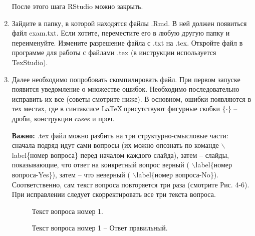 \documentclass[11pt, a4paper]{extarticle}
\newcommand{\code}[1]{{\color{blue} #1}}
\newcommand{\form}[1]{{\color{magenta} #1}}
\begin{document}
\begin{enumerate}
	После этого шага \form{RStudio} можно закрыть. 
	
	\item Зайдите в папку, в которой находятся файлы \form{.Rmd}. В ней должен появиться файл \form{exam.txt}. Если хотите, переместите его в любую другую папку и переименуйте. Измените разрешение файла с \form{.txt} на \form{.tex}. Откройте файл в программе для работы с файлами \form{.tex} (в инструкции используется \form{TexStudio}).
	
	\item Далее необходимо попробовать скомпилировать файл. При первом запуске появится уведомление о множестве ошибок. Необходимо последовательно исправить их все (советы смотрите ниже). В основном, ошибки появляются в тех местах, где в синтаксисе \LaTeX \,присутствуют фигурные скобки \code{\{$\cdot$\}} – дроби, конструкции \code{cases} и проч.
	
	\textbf{Важно:} \form{.tex} файл можно разбить на три структурно-смысловые части: сначала подряд идут сами вопросы (их можно опознать по команде \code{$\backslash$label\{номер вопроса\}} перед началом каждого слайда), затем – слайды, показывающие, что ответ на конкретный вопрос верный (\code{$\backslash$label\{номер вопроса-Yes\}}), затем – что неверный (\code{$\backslash$label\{номер вопроса-No\}}). Соответственно, сам текст вопроса повторяется три раза (смотрите Рис. 4-6). При исправлении следует скорректировать все три текста вопроса. 
	
	\begin{figure}[h!]
	\centering
	\caption{Текст вопроса номер 1.}
	\end{figure}

	\begin{figure}[h!]
	\centering
	\caption{Текст вопроса номер 1 – Ответ правильный.}
	\end{figure}


\end{enumerate}
\end{document}
